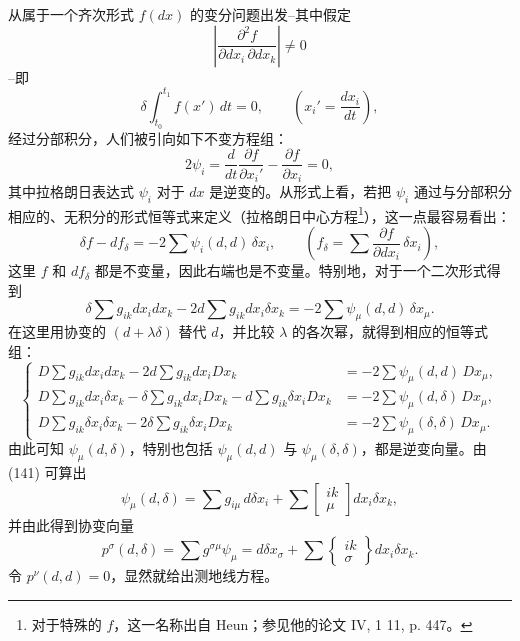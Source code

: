 从属于一个齐次形式 $f(dx)$ 的变分问题出发--其中假定
\[
\left|\frac{\partial^2 f}{\partial dx_i\,\partial dx_k}\right|\ne0
\]
--即
\begin{equation}
 \delta\int_{t_0}^{t_1} f(x')\,dt=0,
 \qquad \left(x_i'=\frac{dx_i}{dt}\right),
\tag{140}
\end{equation}
经过分部积分，人们被引向如下不变方程组：
\[
 2\psi_i=\frac{d}{dt}\frac{\partial f}{\partial x_i'}-\frac{\partial f}{\partial x_i}=0,
\]
其中拉格朗日表达式 $\psi_i$ 对于 $dx$ 是逆变的。从形式上看，若把 $\psi_i$ 通过与分部积分相应的、无积分的形式恒等式来定义（拉格朗日中心方程\footnote{对于特殊的 $f$，这一名称出自 Heun；参见他的论文 IV, 1 11, p. 447。}），这一点最容易看出：
\[
 \delta f-df_\delta=-2\sum\psi_i(d,d)\,\delta x_i,
 \qquad
 \left(f_\delta=\sum\frac{\partial f}{\partial dx_i}\,\delta x_i\right),
\]
这里 $f$ 和 $df_\delta$ 都是不变量，因此右端也是不变量。特别地，对于一个二次形式得到
\[
 \delta\sum g_{ik}dx_i dx_k-2d\sum g_{ik}dx_i\delta x_k
 =-2\sum\psi_\mu(d,d)\,\delta x_\mu.
\]
在这里用协变的 $(d+\lambda\delta)$ 替代 $d$，并比较 $\lambda$ 的各次幂，就得到相应的恒等式组：
\begin{equation}
\left\{
\begin{aligned}
D\sum g_{ik}dx_i dx_k-2d\sum g_{ik}dx_iDx_k
   &=-2\sum\psi_\mu(d,d)\,Dx_\mu,\\
D\sum g_{ik}dx_i\delta x_k-\delta\sum g_{ik}dx_iDx_k
   -d\sum g_{ik}\delta x_iDx_k
   &=-2\sum\psi_\mu(d,\delta)\,Dx_\mu,\\
D\sum g_{ik}\delta x_i\delta x_k-2\delta\sum g_{ik}\delta x_iDx_k
   &=-2\sum\psi_\mu(\delta,\delta)\,Dx_\mu.
\end{aligned}
\right.
\tag{141}
\end{equation}
由此可知 $\psi_\mu(d,\delta)$，特别也包括 $\psi_\mu(d,d)$ 与 $\psi_\mu(\delta,\delta)$，都是逆变向量。由 (141) 可算出
\[
 \psi_\mu(d,\delta)=\sum g_{i\mu}\,d\delta x_i+
 \sum\left[\begin{smallmatrix}ik\\ \mu\end{smallmatrix}\right]dx_i\delta x_k,
\]
并由此得到协变向量
\begin{equation}
 p^\sigma(d,\delta)=\sum g^{\sigma\mu}\psi_\mu
 =d\delta x_\sigma+
 \sum\left\{\begin{smallmatrix}ik\\ \sigma\end{smallmatrix}\right\}dx_i\delta x_k.
\tag{142}
\end{equation}
令 $p^\nu(d,d)=0$，显然就给出测地线方程。

